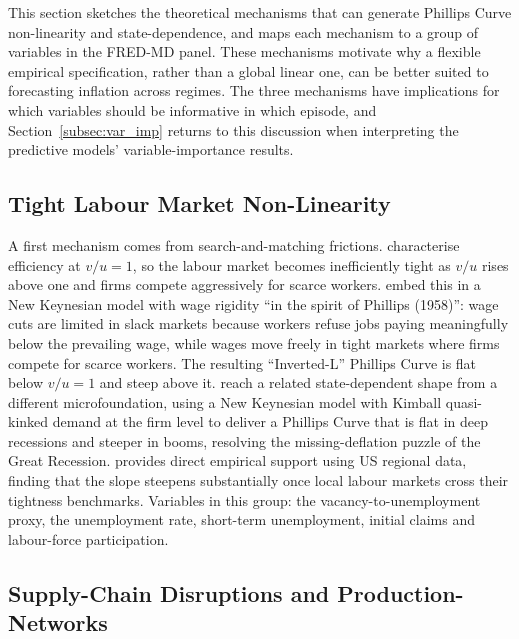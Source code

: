 \documentclass[12pt,a4paper]{article}
\begin{document}
This section sketches the theoretical mechanisms that can generate Phillips Curve non-linearity and state-dependence, and maps each mechanism to a group of variables in the FRED-MD panel. These mechanisms motivate why a flexible empirical specification, rather than a global linear one, can be better suited to forecasting inflation across regimes. The three mechanisms have implications for which variables should be informative in which episode, and Section~\ref{subsec:var_imp} returns to this discussion when interpreting the predictive models'  variable-importance results. 


\subsection{Tight Labour Market Non-Linearity}
\label{subsec:theory_labor}

A first mechanism comes from search-and-matching frictions. \citet{michaillat2024} characterise efficiency at $v/u = 1$, so the labour market becomes inefficiently tight as $v/u$ rises above one and firms compete aggressively for scarce workers. \citet{benigno2023} embed this in a New Keynesian model with wage rigidity ``in the spirit of Phillips (1958)'': wage cuts are limited in slack markets because workers refuse jobs paying meaningfully below the prevailing wage, while wages move freely in tight markets where firms compete for scarce workers. The resulting ``Inverted-L'' Phillips Curve is flat below $v/u = 1$ and steep above it. \citet{harding2023} reach a related state-dependent shape from a different microfoundation, using a New Keynesian model with Kimball quasi-kinked demand at the firm level to deliver a Phillips Curve that is flat in deep recessions and steeper in booms, resolving the missing-deflation puzzle of the Great Recession. \citet{gitti2024} provides direct empirical support using US regional data, finding that the slope steepens substantially once local labour markets cross their tightness benchmarks. Variables in this group: the vacancy-to-unemployment proxy, the unemployment rate, short-term unemployment, initial claims and labour-force participation.

\subsection{Supply-Chain Disruptions and Production-Networks}
\label{subsec:theory_supply}
\end{document}

